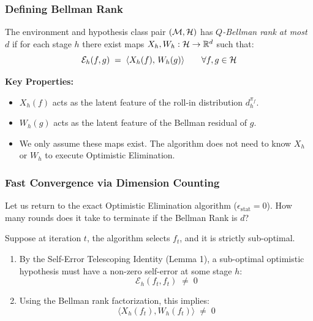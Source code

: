 \documentclass[aspectratio=169]{beamer}
\begin{document}
\begin{frame}\frametitle{Defining Bellman Rank}

\begin{definition}
The environment and hypothesis class pair $(\mathcal{M},\mathcal{H})$ has \emph{$Q$-Bellman rank at most $d$} if for each stage $h$ there exist maps $X_h, W_h: \mathcal{H} \to \mathbb{R}^d$ such that:
\[
\mathcal{E}_h(f,g) \;=\; \langle X_h(f),\, W_h(g)\rangle \qquad \forall f,g\in\mathcal{H}
\]
\end{definition}

\pause
\vspace{0.4cm}
\textbf{Key Properties:}
\begin{itemize}
    \item $X_h(f)$ acts as the latent feature of the roll-in distribution $d_h^{\pi_f}$.
    \item $W_h(g)$ acts as the latent feature of the Bellman residual of $g$.
    \item We only assume these maps exist. The algorithm does not need to know $X_h$ or $W_h$ to execute Optimistic Elimination.
\end{itemize}
\end{frame}

\begin{frame}\frametitle{Fast Convergence via Dimension Counting}

Let us return to the exact Optimistic Elimination algorithm ($\epsilon_{\text{stat}} = 0$). How many rounds does it take to terminate if the Bellman Rank is $d$?

\vspace{0.4cm}
\pause
Suppose at iteration $t$, the algorithm selects $f_t$, and it is strictly sub-optimal.
\begin{enumerate}
    \item By the Self-Error Telescoping Identity (Lemma 1), a sub-optimal optimistic hypothesis must have a non-zero self-error at some stage $h$:
    \[
    \mathcal{E}_h(f_t, f_t) \;\neq\; 0
    \]
    \pause
    \item Using the Bellman rank factorization, this implies:
    \[
    \langle X_h(f_t), W_h(f_t) \rangle \;\neq\; 0
    \]
\end{enumerate}

\end{frame}
\end{document}
